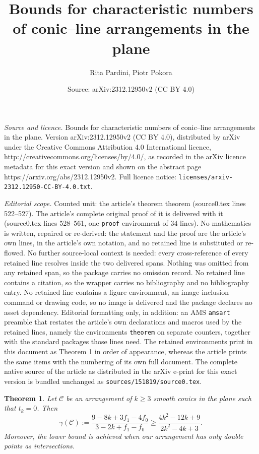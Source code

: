 \documentclass[10pt,a4paper]{amsart}
\title{Bounds for characteristic numbers of conic--line arrangements in the plane}
\author{Rita Pardini, Piotr Pokora}
\date{Source: arXiv:2312.12950v2 (CC BY 4.0)}
\newtheorem{theorem}{Theorem}
\renewcommand\geq{\geqslant}
\begin{document}
\maketitle

\noindent\emph{Source and licence.} Bounds for characteristic numbers of conic--line arrangements in the plane. Version arXiv:2312.12950v2 (CC BY 4.0), distributed by arXiv under the Creative Commons Attribution 4.0 International licence, http://creativecommons.org/licenses/by/4.0/, as recorded in the arXiv licence metadata for this exact version and shown on the abstract page https://arxiv.org/abs/2312.12950v2. Full licence notice: \texttt{licenses/arxiv-2312.12950-CC-BY-4.0.txt}.\par\smallskip

\noindent\textit{Editorial scope.} Counted unit: the article's theorem theorem (source0.tex lines 522--527). The article's complete original proof of it is delivered with it (source0.tex lines 528--561, one \texttt{proof} environment of 34 lines). No mathematics is written, repaired or re-derived: the statement and the proof are the article's own lines, in the article's own notation, and no retained line is substituted or re-flowed.  No further source-local context is needed: every cross-reference of every retained line resolves inside the two delivered spans.  Nothing was omitted from any retained span, so the package carries no omission record.  No retained line contains a citation, so the wrapper carries no bibliography and no bibliography entry.  No retained line contains a figure environment, an image-inclusion command or drawing code, so no image is delivered and the package declares no asset dependency.  Editorial formatting only, in addition: an AMS \texttt{amsart} preamble that restates the article's own declarations and macros used by the retained lines, namely the environments \texttt{theorem} on separate counters, together with the standard packages those lines need.  The retained environments print in this document as Theorem 1 in order of appearance, whereas the article prints the same items with the numbering of its own full document.  The complete native source of the article as distributed in the arXiv e-print for this exact version is bundled unchanged as \texttt{sources/151819/source0.tex}.
\begin{theorem}
Let $\mathcal{C}$ be an arrangement of $k\geq 3$ smooth conics in the plane such that $t_{k}=0$.
Then 
$$\gamma(\mathcal{C}) :=\frac{9-8k+3f_{1}-4f_{0}}{3-2k+f_{1}-f_{0}} \geq \frac{4k^2-12k+9}{2k^{2}-4k+3}.$$
Moreover, the lower bound is achieved when our arrangement has only double points as intersections.
\end{theorem}
\end{document}
